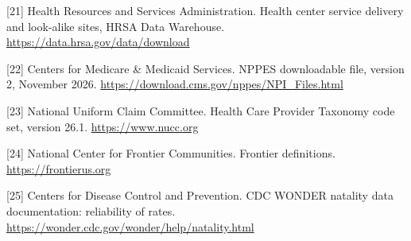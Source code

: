 \documentclass{article}
\begin{document}
[21] Health Resources and Services Administration. Health center service delivery and look-alike sites, HRSA Data Warehouse. \url{https://data.hrsa.gov/data/download}

[22] Centers for Medicare \& Medicaid Services. NPPES downloadable file, version 2, November 2026. \url{https://download.cms.gov/nppes/NPI_Files.html}

[23] National Uniform Claim Committee. Health Care Provider Taxonomy code set, version 26.1. \url{https://www.nucc.org}

[24] National Center for Frontier Communities. Frontier definitions. \url{https://frontierus.org}

[25] Centers for Disease Control and Prevention. CDC WONDER natality data documentation: reliability of rates. \url{https://wonder.cdc.gov/wonder/help/natality.html}
\end{document}
